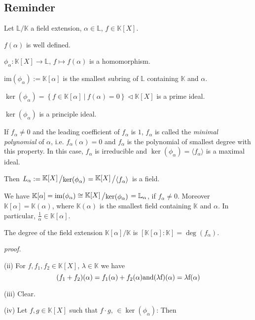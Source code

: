 \documentclass[12pt]{book}
\newcommand{\slant}[2]{{\raisebox{.1em}{$#1$}\left/\raisebox{-.1em}{$#2$}\right.}}
\begin{document}
\begin{spacing}{1.3}
\subsection{Reminder} %
Let $\mathbb{L}/\mathbb{K}$ a field extension, $\alpha \in \mathbb{L}$, $f \in \mathbb{K}[X]$.
\begin{compactenum}
\item $f(\alpha)$ is well defined.
\item $\phi_{\alpha}: \mathbb{K}[X] \rightarrow \mathbb{L}$, $f \mapsto f(\alpha)$ is a homomorphism.
\item $\textrm{im}(\phi_{\alpha}):=\mathbb{K}[\alpha]$ is the smallest subring of $\mathbb{L}$ containing $\mathbb{K}$ and $\alpha$.
\item $\ker(\phi_{\alpha})=\left\{f \in \mathbb{K}[\alpha] \ \big \vert \ f(\alpha)=0\right\} \triangleleft \mathbb{K}[X]$ is a prime ideal.
\item $\ker(\phi_{\alpha})$ is a principle ideal.
\item If $f_{\alpha}\neq 0$ and the leading coefficient of $f_{\alpha}$ is $1$, $f_{\alpha}$ is called the \textit{minimal polynomial} of $\alpha$, i.e. $f_{\alpha}(\alpha)=0$ and $f_{\alpha}$ is the polynomial of smallest degree with this property. In this case, $f_{\alpha}$ is irreducible and $\ker(\phi_{\alpha})=\langle f_{\alpha} \rangle$ is a maximal ideal.
\item Then $L_{\alpha}:=\slant{\mathbb{K}[X]}{\ker(\phi_{\alpha})}=\slant{\mathbb{K}[X]}{\langle f_{\alpha}\rangle}$ is a field.
\item We have $\mathbb{K}[\alpha]=\textrm{im}(\phi_{\alpha}) \cong \slant{\mathbb{K}[X]}{\ker(\phi_{\alpha})}=\mathbb{L}_{\alpha}$, if $f_{\alpha}\neq 0$.
Moreover $\mathbb{K}[\alpha]=\mathbb{K}(\alpha)$, where $\mathbb{K}(\alpha)$ is the smallest field containing $\mathbb{K}$ and $\alpha$. In particular, $\frac{1}{\alpha} \in \mathbb{K}[\alpha]$.
\item The degree of the field extension $\mathbb{K}[\alpha]/\mathbb{K}$ is $[\mathbb{K}[\alpha]:\mathbb{K}]=\deg(f_{\alpha})$. 
\end{compactenum}
\pagebreak
\textit{proof.}
\begin{compactenum}
\item[(ii)]  For $f,f_1,f_2 \in \mathbb{K}[X]$, $\lambda \in \mathbb{K}$ we have
$$(f_1+f_2)(\alpha)=f_1(\alpha)+f_2(\alpha)\rm{ and }(\lambda f)(\alpha)=\lambda f(\alpha)$$
\item[(iii)] Clear.
\item[(iv)] Let $f,g \in \mathbb{K}[X]$ such that $f\cdot g$, $\in \ker(\phi_{\alpha})$: Then

\end{compactenum}
\end{spacing}
\end{document}
